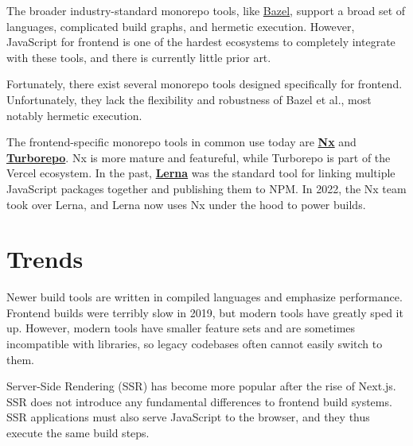 \documentclass{article}
\begin{document}
The broader industry-standard monorepo tools, like  \href{https://bazel.build/}{Bazel}, support a
broad set of languages, complicated build graphs, and hermetic execution. However, JavaScript for
frontend is one of the hardest ecosystems to completely integrate with these tools, and there is
currently little prior art.

Fortunately, there exist several monorepo tools designed specifically for frontend. Unfortunately,
they lack the flexibility and robustness of Bazel et al., most notably hermetic execution.

The frontend-specific monorepo tools in common use today are \href{https://nx.dev/}{\textbf{Nx}} and
\href{https://turbo.build/repo}{\textbf{Turborepo}}. Nx is more mature and featureful, while
Turborepo is part of the Vercel ecosystem. In the past, \href{https://lerna.js.org/}{\textbf{Lerna}}
was the standard tool for linking multiple JavaScript packages together and publishing them to NPM.
In 2022, the Nx team took over Lerna, and Lerna now uses Nx under the hood to power builds.

\section{Trends}

Newer build tools are written in compiled languages and emphasize performance. Frontend builds were
terribly slow in 2019, but modern tools have greatly sped it up. However, modern tools have smaller
feature sets and are sometimes incompatible with libraries, so legacy codebases often cannot easily
switch to them.

Server-Side Rendering (SSR) has become more popular after the rise of Next.js. SSR does not
introduce any fundamental differences to frontend build systems. SSR applications must also serve
JavaScript to the browser, and they thus execute the same build steps.
\end{document}
